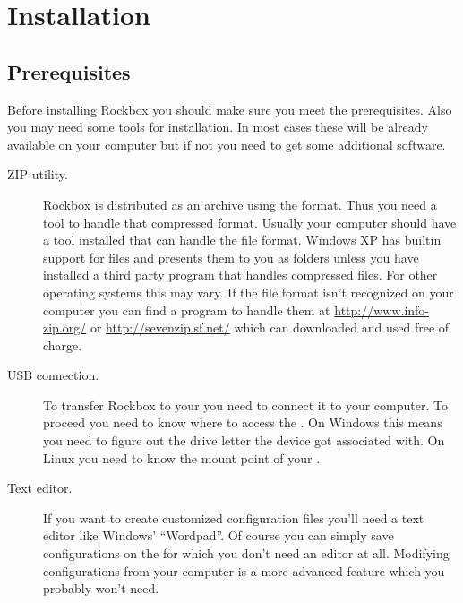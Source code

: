 \chapter{Installation}\label{sec:installation}
\section{Prerequisites}\label{sec:prerequisites}
Before installing Rockbox you should make sure you meet the prerequisites.
Also you may need some tools for installation. In most cases these will be
already available on your computer but if not you need to get some additional
software.

\begin{description}
\item[ZIP utility.]
  Rockbox is distributed as an archive using the  format. Thus you
  need a tool to handle that compressed format. Usually your
  computer should have a tool installed that can handle the  file 
  format.
  Windows XP has builtin support for  files and presents them to 
  you as folders unless you have installed a third party program that handles
  compressed files. For other operating systems this may vary. If the 
   file format isn't recognized on your computer you can find a 
  program to handle them at \url{http://www.info-zip.org/} or
  \url{http://sevenzip.sf.net/} which can downloaded and used free of
  charge.
\item[USB connection.]
  To transfer Rockbox to your \dap{} you need to connect it to your computer.
  To proceed you need to know where to access the \dap{}. On Windows this
  means you need to figure out the drive letter the device got associated
  with. On Linux you need to know the mount point of your \dap{}.
\item[Text editor.]
  If you want to create customized configuration files you'll need a text
  editor like Windows' ``Wordpad''. Of course you can simply save
  configurations on the \dap{} for which you don't need an editor at all.
  Modifying configurations from your computer is a more advanced feature
  which you probably won't need.
\end{description}



